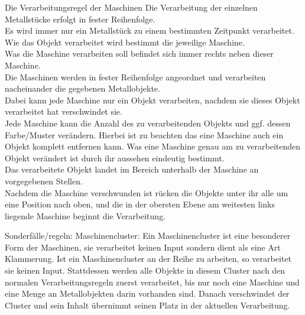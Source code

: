 \documentclass{scrartcl}
\begin{document}
\begin{description}
\begin{minipage}{1\textwidth}
	\item[Die Verarbeitungsregel der Maschinen] Die Verarbeitung der einzelnen Metallstücke erfolgt in fester Reihenfolge.\\
	Es wird immer nur ein Metallstück zu einem bestimmten Zeitpunkt verarbeitet.\\
	Wie das Objekt verarbeitet wird bestimmt die jeweilige Maschine.\\
	Was die Maschine verarbeiten soll befindet sich immer rechts neben dieser Maschine.\\
	Die Maschinen werden in fester Reihenfolge angeordnet und verarbeiten nacheinander die gegebenen Metallobjekte.\\
	Dabei kann jede Maschine nur ein Objekt verarbeiten, nachdem sie dieses Objekt verarbeitet hat verschwindet sie.\\
	Jede Maschine kann die Anzahl des zu verarbeitenden Objekts und ggf. dessen Farbe/Muster verändern. Hierbei ist zu beachten das eine Maschine auch ein Objekt komplett entfernen kann. Was eine Maschine genau am zu verarbeitenden Objekt verändert ist durch ihr aussehen eindeutig bestimmt.\\
	Das verarbeitete Objekt landet im Bereich unterhalb der Maschine an vorgegebenen Stellen.\\
	Nachdem die Maschine verschwunden ist rücken die Objekte unter ihr alle um eine Position nach oben, und die in der obersten Ebene am weitesten links liegende Maschine beginnt die Verarbeitung.\\
\end{minipage}	
	
\begin{minipage}{1\textwidth}
	\item[Sonderfälle/regeln:] Maschinencluster: Ein Maschinencluster ist eine besonderer Form der Maschinen, sie verarbeitet keinen Input sondern dient als eine Art \glqq Klammerung\grqq. Ist ein Maschinencluster an der Reihe zu arbeiten, so verarbeitet sie keinen Input. Stattdessen werden alle Objekte in diesem Cluster nach den normalen Verarbeitungsregeln zuerst verarbeitet, bis nur noch eine Maschine und eine Menge an Metallobjekten darin vorhanden sind. Danach verschwindet der Cluster und sein Inhalt übernimmt seinen Platz in der aktuellen Verarbeitung.\\
\end{minipage}

\end{description}
\end{document}
